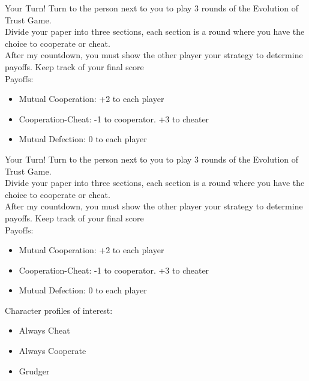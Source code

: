 \documentclass[10pt]{beamer} %
\theoremstyle{plain} %
\theoremstyle{definition} %
\begin{document}
\begin{frame}{\color{Maroon} \small Your Turn!}
Turn to the person next to you to play 3 rounds of the Evolution of Trust Game. \\
\vfill
\noindent Divide your paper into three sections, each section is a round where you have the choice to cooperate or cheat. \\
\noindent After my countdown, you must show the other player your strategy to determine payoffs. Keep track of your final score \\
\vfill
\noindent Payoffs:
\begin{itemize}
    \item Mutual Cooperation: +2 to each player
    \item Cooperation-Cheat: -1 to cooperator. +3 to cheater
    \item Mutual Defection: 0 to each player
\end{itemize}

\end{frame}


\begin{frame}{\color{Maroon} \small Your Turn!}
Turn to the person next to you to play 3 rounds of the Evolution of Trust Game. \\
\vfill
\noindent Divide your paper into three sections, each section is a round where you have the choice to cooperate or cheat. \\
\noindent After my countdown, you must show the other player your strategy to determine payoffs. Keep track of your final score \\
\vfill
\noindent Payoffs:
\begin{itemize}
    \item Mutual Cooperation: +2 to each player
    \item Cooperation-Cheat: -1 to cooperator. +3 to cheater
    \item Mutual Defection: 0 to each player
\end{itemize}
\vfill
\noindent Character profiles of interest: \\
\begin{itemize}
    \item Always Cheat
    \item Always Cooperate
    \item Grudger
\end{itemize}

\end{frame}
\end{document}
